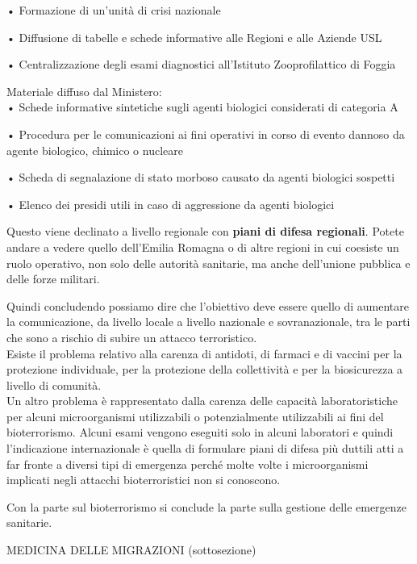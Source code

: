 \documentclass[]{article}
\begin{document}
• Formazione di un'unità di crisi nazionale

• Diffusione di tabelle e schede informative alle Regioni e alle Aziende
USL

• Centralizzazione degli esami diagnostici all'Istituto Zooprofilattico
di Foggia

Materiale diffuso dal Ministero:\\
• Schede informative sintetiche sugli agenti biologici considerati di
categoria A

• Procedura per le comunicazioni ai fini operativi in corso di evento
dannoso da agente biologico, chimico o nucleare

• Scheda di segnalazione di stato morboso causato da agenti biologici
sospetti

• Elenco dei presidi utili in caso di aggressione da agenti biologici

Questo viene declinato a livello regionale con \textbf{piani di difesa
regionali}. Potete andare a vedere quello dell'Emilia Romagna o di altre
regioni in cui coesiste un ruolo operativo, non solo delle autorità
sanitarie, ma anche dell'unione pubblica e delle forze militari.

Quindi concludendo possiamo dire che l'obiettivo deve essere quello di
aumentare la comunicazione, da livello locale a livello nazionale e
sovranazionale, tra le parti che sono a rischio di subire un attacco
terroristico.\\
Esiste il problema relativo alla carenza di antidoti, di farmaci e di
vaccini per la protezione individuale, per la protezione della
collettività e per la biosicurezza a livello di comunità.\\
Un altro problema è rappresentato dalla carenza delle capacità
laboratoristiche per alcuni microorganismi utilizzabili o potenzialmente
utilizzabili ai fini del bioterrorismo. Alcuni esami vengono eseguiti
solo in alcuni laboratori e quindi l'indicazione internazionale è quella
di formulare piani di difesa più duttili atti a far fronte a diversi
tipi di emergenza perché molte volte i microorganismi implicati negli
attacchi bioterroristici non si conoscono.

Con la parte sul bioterrorismo si conclude la parte sulla gestione delle
emergenze sanitarie.

MEDICINA DELLE MIGRAZIONI (sottosezione)
\end{document}
